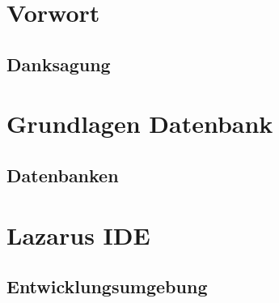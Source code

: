 \documentclass[
titlepage,						%
]
{scrreprt}
\begin{document}
\newpage
\chapter[Vorwort]{Vorwort}
\section{Danksagung}

\chapter{Grundlagen Datenbank}
\section[Datenbanken]{Datenbanken}

\newpage

\newpage

\chapter{Lazarus IDE}
\section[Entwicklungsumgebung]{Entwicklungsumgebung}

\newpage

\newpage

\newpage
\end{document}
